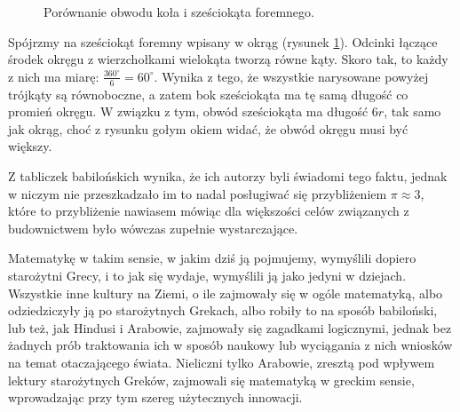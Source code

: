 \documentclass[12pt, a4paper]{scrartcl}
\begin{document}
\begin{figure}[ht!]
    \begin{center}
      \caption{Porównanie obwodu koła i sześciokąta foremnego.}
      \label{fig:approxpi}
  \end{center}
\end{figure}

Spójrzmy na sześciokąt foremny wpisany w okrąg (rysunek \ref{fig:approxpi}).
Odcinki łączące środek okręgu z wierzchołkami wielokąta tworzą równe kąty. Skoro
tak, to każdy z nich ma miarę: \(\frac{360^\circ}{6} = 60^\circ\). Wynika z tego,
że wszystkie narysowane powyżej trójkąty są równoboczne, a zatem bok sześciokąta
ma tę samą długość co promień okręgu. W związku z tym, obwód sześciokąta ma
długość \(6r\), tak samo jak okrąg, choć z rysunku gołym okiem widać, że obwód
okręgu musi być większy.

Z tabliczek babilońskich wynika, że ich autorzy byli świadomi tego faktu, jednak
w niczym nie przeszkadzało im to nadal posługiwać się przybliżeniem $\pi
\approx 3$, które to przybliżenie nawiasem mówiąc dla większości celów
związanych z budownictwem było wówczas zupełnie wystarczające.

Matematykę w takim sensie, w jakim dziś ją pojmujemy, wymyślili dopiero
starożytni Grecy, i to jak się wydaje, wymyślili ją jako jedyni w dziejach.
Wszystkie inne kultury na Ziemi, o ile zajmowały się w ogóle matematyką, albo
odziedziczyły ją po starożytnych Grekach, albo robiły to na sposób babiloński,
lub też, jak Hindusi i Arabowie, zajmowały się zagadkami logicznymi, jednak bez
żadnych prób traktowania ich w sposób naukowy lub wyciągania z nich wniosków na
temat otaczającego świata. Nieliczni tylko Arabowie, zresztą pod wpływem lektury
starożytnych Greków, zajmowali się matematyką w greckim sensie, wprowadzając przy
tym szereg użytecznych innowacji.
\end{document}
